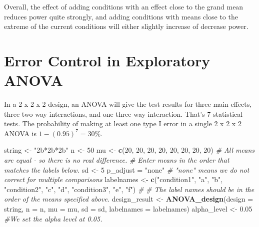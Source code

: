 \documentclass[]{book}
\newenvironment{Shaded}{\begin{snugshade}}{\end{snugshade}}
\newcommand{\CommentTok}[1]{\textcolor[rgb]{0.56,0.35,0.01}{\textit{#1}}}
\newcommand{\DataTypeTok}[1]{\textcolor[rgb]{0.13,0.29,0.53}{#1}}
\newcommand{\DecValTok}[1]{\textcolor[rgb]{0.00,0.00,0.81}{#1}}
\newcommand{\FloatTok}[1]{\textcolor[rgb]{0.00,0.00,0.81}{#1}}
\newcommand{\KeywordTok}[1]{\textcolor[rgb]{0.13,0.29,0.53}{\textbf{#1}}}
\newcommand{\NormalTok}[1]{#1}
\newcommand{\StringTok}[1]{\textcolor[rgb]{0.31,0.60,0.02}{#1}}
\begin{document}
Overall, the effect of adding conditions with an effect close to the grand mean reduces power quite strongly, and adding conditions with means close to the extreme of the current conditions will either slightly increase of decrease power.

\hypertarget{error-control-in-exploratory-anova}{%
\chapter{Error Control in Exploratory ANOVA}\label{error-control-in-exploratory-anova}}

In a 2 x 2 x 2 design, an ANOVA will give the test results for three main effects, three two-way interactions, and one three-way interaction. That's 7 statistical tests. The probability of making at least one type I error in a single 2 x 2 x 2 ANOVA is \(1-(0.95)^7 = 30\)\%.

\begin{Shaded}
\begin{Highlighting}[]
\NormalTok{string <-}\StringTok{ "2b*2b*2b"}
\NormalTok{n <-}\StringTok{ }\DecValTok{50}
\NormalTok{mu <-}\StringTok{ }\KeywordTok{c}\NormalTok{(}\DecValTok{20}\NormalTok{, }\DecValTok{20}\NormalTok{, }\DecValTok{20}\NormalTok{, }\DecValTok{20}\NormalTok{, }\DecValTok{20}\NormalTok{, }\DecValTok{20}\NormalTok{, }\DecValTok{20}\NormalTok{, }\DecValTok{20}\NormalTok{) }
\CommentTok{# All means are equal - so there is no real difference.}
\CommentTok{# Enter means in the order that matches the labels below.}
\NormalTok{sd <-}\StringTok{ }\DecValTok{5}
\NormalTok{p_adjust =}\StringTok{ "none"}
\CommentTok{# "none" means we do not correct for multiple comparisons}
\NormalTok{labelnames <-}\StringTok{ }\KeywordTok{c}\NormalTok{(}\StringTok{"condition1"}\NormalTok{, }\StringTok{"a"}\NormalTok{, }\StringTok{"b"}\NormalTok{, }
                \StringTok{"condition2"}\NormalTok{, }\StringTok{"c"}\NormalTok{, }\StringTok{"d"}\NormalTok{, }
                \StringTok{"condition3"}\NormalTok{, }\StringTok{"e"}\NormalTok{, }\StringTok{"f"}\NormalTok{) }\CommentTok{#}
\CommentTok{# The label names should be in the order of the means specified above.}
\NormalTok{design_result <-}\StringTok{ }\KeywordTok{ANOVA_design}\NormalTok{(}\DataTypeTok{design =}\NormalTok{ string,}
                   \DataTypeTok{n =}\NormalTok{ n, }
                   \DataTypeTok{mu =}\NormalTok{ mu, }
                   \DataTypeTok{sd =}\NormalTok{ sd, }
                   \DataTypeTok{labelnames =}\NormalTok{ labelnames)}
\NormalTok{alpha_level <-}\StringTok{ }\FloatTok{0.05}
\CommentTok{#We set the alpha level at 0.05. }
\end{Highlighting}
\end{Shaded}
\end{document}
